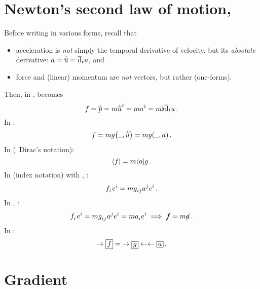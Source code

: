 
\section{Newton's second law of motion, }
\label{sec:newton-second-law-motion}

Before writing  in various forms, recall that~\cite{misner1973}
%
\begin{itemize}
\item acceleration is \emph{not} simply the temporal derivative of velocity, but its \emph{absolute} derivative: $a = \dot{\overline{u}} = \overline{\mathrm{d}}_{t}u$, and
\item force and (linear) momentum are \emph{not} vectors, but rather  (one-forms).
\end{itemize}

Then, in ,  becomes
%
\begin{equation*}
  f = \dot{\overline{p}}
  = m{\dot{\overline{u}}}^{\flat}
  = m{a}^{\flat}
  = m\flat\overline{\mathrm{d}}_{t}u\,.
\end{equation*}
%
In :
%
\begin{equation*}
  \force = \mass\metric\vat{\eslot,\adt\vel}
  = \mass\metric\vat{\eslot,\acc}\,.
\end{equation*}
%
In  (\aka\ Dirac's notation):
%
\begin{equation*}
  \langle f\rvert = m\langle a\rvert g\,.
\end{equation*}
%
In  (index notation) with , :
%
\begin{equation*}
  \tcov\force i\tbcov i = \mass\tmetric ij\tvec\acc j\tbcov i\,.
\end{equation*}
%
In , :
%
\begin{equation*}
  \tcov\force i\tbcov i = \mass\tmetric ij\tvec\acc j\tbcov i
  = \mass\tcov\acc i\tbcov i
  \implies
  \slashed\force = \mass\slashed\acc\,.
\end{equation*}
%
In :
%
\begin{equation*}
  {\rightarrow\bxtens\force}
  = {\rightarrow\bxtens\metric\leftarrow
  \leftarrow\bxtens\acc}\,.
\end{equation*}


\section{Gradient}
\label{sec:gradient}

